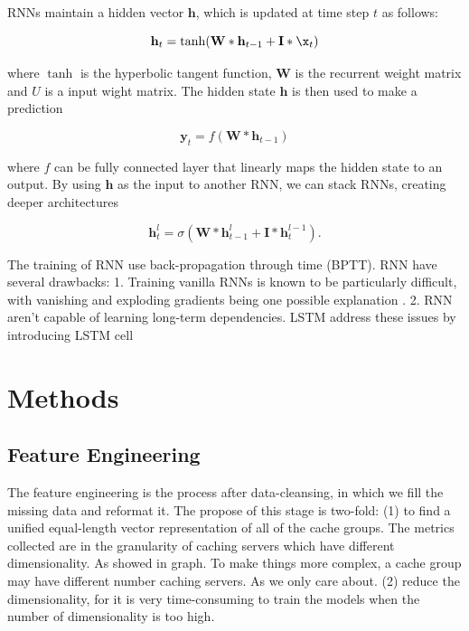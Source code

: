 \documentclass[5p]{elsarticle}
\begin{document}
RNNs maintain a hidden vector $\mathbf h$, which is updated at time step $t$ as follows:

\begin{equation}
	\mathbf h_t = \tanh(\mathbf W * \mathbf h_{t-1} + \mathbf I * \x_t)
\end{equation}

where $\tanh$ is the hyperbolic tangent function, $\mathbf W$ is the recurrent weight matrix and $U$ is a input wight matrix. The hidden state $\mathbf h$ is then used to make a prediction

\begin{equation}
	\mathbf y_t = f(\mathbf W * \mathbf h_{t-1})
\end{equation}

where $f$ can be fully connected layer that linearly maps the hidden state to an output. By using $\mathbf h$ as the input to another RNN, we can stack RNNs, creating deeper architectures 

\begin{equation}
	\mathbf h_t^{l} = \sigma(\mathbf W * \mathbf h_{t-1}^{l} + \mathbf I * \mathbf h_t^{l-1}).
\end{equation}

The training of RNN use back-propagation through time (BPTT). RNN have several drawbacks: 1. Training vanilla RNNs is known to be particularly difficult, with vanishing and exploding gradients being one possible explanation \cite{Bengio1994LearningDifficult}. 2. RNN aren't capable of learning long-term dependencies. LSTM address these issues by introducing LSTM cell\cite{Hochreiter1997LongMemory} 


\section{Methods}
\subsection{Feature Engineering}
The feature engineering is the process after data-cleansing, in which we fill the missing data and reformat it. The propose of this stage is two-fold:
(1) to find a unified equal-length vector representation of all of the cache groups. 
The metrics collected are in the granularity of caching servers which have different dimensionality. As showed in graph. To make things more complex, a cache group may have different number caching servers. As we only care about. 
(2) reduce the dimensionality, for it is very time-consuming to train the models when the number of dimensionality is too high.
\end{document}
